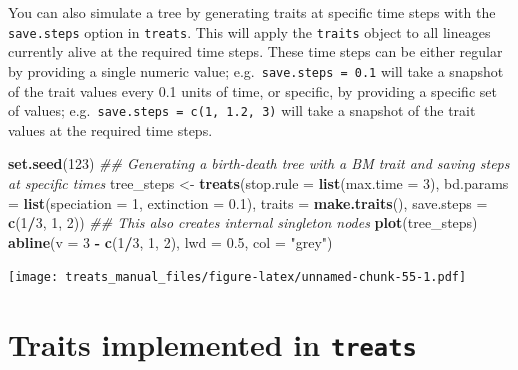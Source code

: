 \documentclass[
]{book}
\newenvironment{Shaded}{\begin{snugshade}}{\end{snugshade}}
\newcommand{\CommentTok}[1]{\textcolor[rgb]{0.56,0.35,0.01}{\textit{#1}}}
\newcommand{\DataTypeTok}[1]{\textcolor[rgb]{0.13,0.29,0.53}{#1}}
\newcommand{\DecValTok}[1]{\textcolor[rgb]{0.00,0.00,0.81}{#1}}
\newcommand{\FloatTok}[1]{\textcolor[rgb]{0.00,0.00,0.81}{#1}}
\newcommand{\KeywordTok}[1]{\textcolor[rgb]{0.13,0.29,0.53}{\textbf{#1}}}
\newcommand{\NormalTok}[1]{#1}
\newcommand{\OperatorTok}[1]{\textcolor[rgb]{0.81,0.36,0.00}{\textbf{#1}}}
\newcommand{\StringTok}[1]{\textcolor[rgb]{0.31,0.60,0.02}{#1}}
\begin{document}
You can also simulate a tree by generating traits at specific time steps with the \texttt{save.steps} option in \texttt{treats}.
This will apply the \texttt{traits} object to all lineages currently alive at the required time steps.
These time steps can be either regular by providing a single numeric value; e.g.~\texttt{save.steps\ =\ 0.1} will take a snapshot of the trait values every 0.1 units of time, or specific, by providing a specific set of values; e.g.~\texttt{save.steps\ =\ c(1,\ 1.2,\ 3)} will take a snapshot of the trait values at the required time steps.

\begin{Shaded}
\begin{Highlighting}[]
\KeywordTok{set.seed}\NormalTok{(}\DecValTok{123}\NormalTok{)}
\CommentTok{\#\# Generating a birth{-}death tree with a BM trait and saving steps at specific times}
\NormalTok{tree\_steps \textless{}{-}}\StringTok{ }\KeywordTok{treats}\NormalTok{(}\DataTypeTok{stop.rule  =} \KeywordTok{list}\NormalTok{(}\DataTypeTok{max.time =} \DecValTok{3}\NormalTok{),}
                   \DataTypeTok{bd.params  =} \KeywordTok{list}\NormalTok{(}\DataTypeTok{speciation =} \DecValTok{1}\NormalTok{, }\DataTypeTok{extinction =} \FloatTok{0.1}\NormalTok{),}
                   \DataTypeTok{traits     =} \KeywordTok{make.traits}\NormalTok{(),}
                   \DataTypeTok{save.steps =} \KeywordTok{c}\NormalTok{(}\DecValTok{1}\OperatorTok{/}\DecValTok{3}\NormalTok{, }\DecValTok{1}\NormalTok{, }\DecValTok{2}\NormalTok{))}
\CommentTok{\#\# This also creates internal singleton nodes}
\KeywordTok{plot}\NormalTok{(tree\_steps)}
\KeywordTok{abline}\NormalTok{(}\DataTypeTok{v =} \DecValTok{3} \OperatorTok{{-}}\StringTok{ }\KeywordTok{c}\NormalTok{(}\DecValTok{1}\OperatorTok{/}\DecValTok{3}\NormalTok{, }\DecValTok{1}\NormalTok{, }\DecValTok{2}\NormalTok{), }\DataTypeTok{lwd =} \FloatTok{0.5}\NormalTok{, }\DataTypeTok{col =} \StringTok{"grey"}\NormalTok{)}
\end{Highlighting}
\end{Shaded}

\texttt{[image: treats\_manual\_files/figure-latex/unnamed-chunk-55-1.pdf]}

\hypertarget{traits-implemented-in-treats}{%
\section{\texorpdfstring{Traits implemented in \texttt{treats}}{Traits implemented in treats}}\label{traits-implemented-in-treats}}
\end{document}
